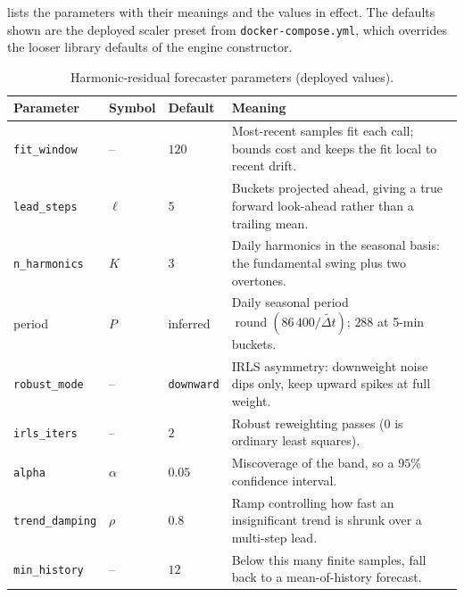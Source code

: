  lists the parameters with their meanings and the values in
effect. The defaults shown are the deployed scaler preset from
\texttt{docker-compose.yml}, which overrides the looser library defaults of the
engine constructor.

\begin{table}[ht]
  \centering
  \caption[Harmonic-residual forecaster parameters]{Harmonic-residual forecaster parameters (deployed values).}
  \label{bm:tab:harmonic}
  \small
  \begin{tabularx}{\linewidth}{@{}l l l Y@{}}
    \toprule
    \headrow
    \textbf{Parameter} & \textbf{Symbol} & \textbf{Default} & \textbf{Meaning} \\
    \midrule
    \texttt{fit\_window}    & --      & $120$ & Most-recent samples fit each call; bounds cost and keeps the fit local to recent drift. \\
    \texttt{lead\_steps}    & $\ell$  & $5$   & Buckets projected ahead, giving a true forward look-ahead rather than a trailing mean. \\
    \texttt{n\_harmonics}   & $K$     & $3$   & Daily harmonics in the seasonal basis: the fundamental swing plus two overtones. \\
    period                  & $P$     & inferred & Daily seasonal period $\operatorname{round}(86\,400/\widetilde{\Delta t})$; $288$ at 5-min buckets. \\
    \texttt{robust\_mode}   & --      & \texttt{downward} & IRLS asymmetry: downweight noise dips only, keep upward spikes at full weight. \\
    \texttt{irls\_iters}    & --      & $2$   & Robust reweighting passes ($0$ is ordinary least squares). \\
    \texttt{alpha}          & $\alpha$ & $0.05$ & Miscoverage of the band, so a $95\%$ confidence interval. \\
    \texttt{trend\_damping} & $\rho$  & $0.8$ & Ramp controlling how fast an insignificant trend is shrunk over a multi-step lead. \\
    \texttt{min\_history}   & --      & $12$  & Below this many finite samples, fall back to a mean-of-history forecast. \\
    \bottomrule
  \end{tabularx}
\end{table}
